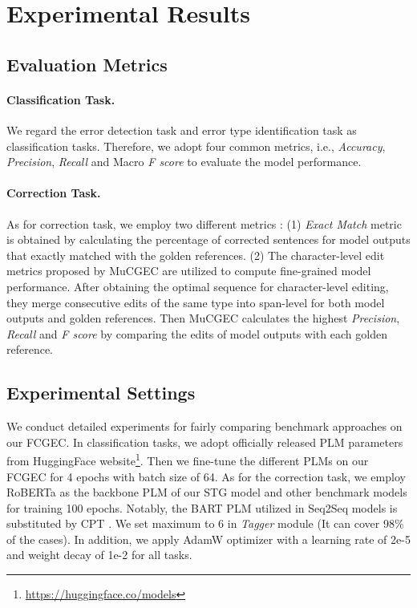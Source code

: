 \documentclass[11pt]{article}
\begin{document}
\section{Experimental Results}

\subsection{Evaluation Metrics}
\paragraph{Classification Task.} We regard the error detection task and error type identification task as classification tasks. Therefore, we adopt four common metrics, i.e., \emph{Accuracy}, \emph{Precision}, \emph{Recall} and Macro \emph{F score} to evaluate the model performance.

\paragraph{Correction Task.} As for correction task, we employ two different metrics : (1) \emph{Exact Match} metric is obtained by calculating the percentage of corrected sentences for model outputs that exactly matched with the golden references. (2) The character-level edit metrics proposed by MuCGEC \cite{zhang2022mucgec} are utilized to compute fine-grained model performance. After obtaining the optimal sequence for character-level editing, they merge consecutive edits of the same type into span-level for both model outputs and golden references. Then MuCGEC calculates the highest \emph{Precision}, \emph{Recall} and \emph{F score} by comparing the edits of model outputs with each golden reference.

\subsection{Experimental Settings}

We conduct detailed experiments for fairly comparing benchmark approaches on our FCGEC. In classification tasks, we adopt officially released PLM parameters from HuggingFace website\footnote{\url{https://huggingface.co/models}}. Then we fine-tune the different PLMs on our FCGEC for 4 epochs with batch size of 64. As for the correction task, we employ RoBERTa as the backbone PLM of our STG model and other benchmark models for training 100 epochs. Notably, the BART PLM \cite{lewis2019bart} utilized in Seq2Seq models is substituted by CPT \cite{shao2021cpt}. We set maximum  to 6 in \emph{Tagger} module (It can cover 98\% of the cases). In addition, we apply AdamW \cite{kingma2014adam} optimizer with a learning rate of 2e-5 and weight decay of 1e-2 for all tasks.
\end{document}
